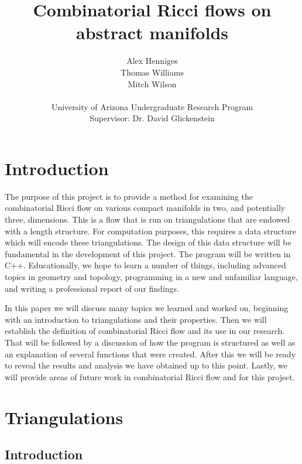 \documentclass[12pt]{article}
\title{Combinatorial Ricci flows on abstract manifolds}
\author{Alex Henniges \\ Thomas Williams \\ Mitch Wilson \\ \\ University of Arizona Undergraduate Research Program\\
Supervisor: Dr. David Glickenstein\\
}
\begin{document}
\maketitle
\thispagestyle{empty}
\newpage
\renewcommand\contentsname{Table of Contents}
\tableofcontents

\newpage
\section{Introduction}
\maketitle

The purpose of this project is to provide a method for examining the combinatorial Ricci flow on various compact manifolds in two, and potentially three, dimensions. This is a flow that is run on triangulations that are endowed with a length structure. For computation purposes, this requires a data structure which will encode these triangulations. The design of this data structure will be fundamental in the development of this project. The program will be written in C++. Educationally, we hope to learn a number of things, including advanced topics in geometry and topology, programming in a new and unfamiliar language, and writing a professional report of our findings. \newline

\noindent In this paper we will discuss many topics we learned and worked on, beginning with an introduction to triangulations and their properties. Then we will establish the definition of combinatorial Ricci flow and its use in our research. That will be followed by a discussion of how the program is structured as well as an explanation of several functions that were created. After this we will be ready to reveal the results and analysis we have obtained up to this point. Lastly, we will provide areas of future work in combinatorial Ricci flow and for this project.

\section{Triangulations}
\maketitle
\subsection{Introduction}
\maketitle
\end{document}
